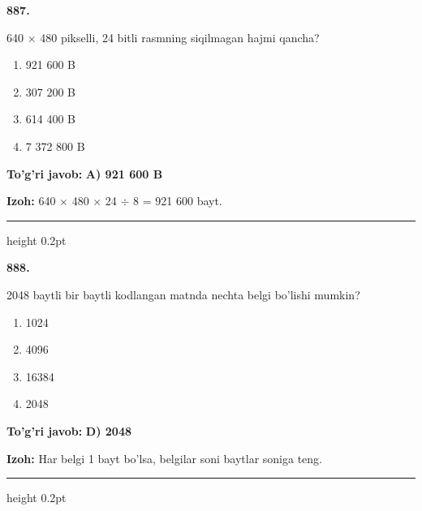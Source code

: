 \documentclass[10pt,a4paper,oneside]{article}
\begin{document}
\noindent\textbf{\color{ink}887.}
\par
640 \ensuremath{\times} 480 pikselli, 24 bitli rasmning siqilmagan hajmi qancha?
\begin{enumerate}[label=\Alph*),leftmargin=9mm]
\item 921 600 B
\item 307 200 B
\item 614 400 B
\item 7 372 800 B
\end{enumerate}
\begin{tcolorbox}[enhanced,breakable,colback=teal!4,colframe=teal!50!black,boxrule=0.5pt,arc=1.1mm,left=3mm,right=3mm,top=1.7mm,bottom=1.7mm,before skip=2mm,after skip=2mm]
\textbf{\color{teal}To'g'ri javob:} \textbf{A) 921 600 B}
\par\smallskip
\textbf{Izoh:} 640 \ensuremath{\times} 480 \ensuremath{\times} 24 \ensuremath{\div} 8 = 921 600 bayt.
\end{tcolorbox}
\vspace{2mm}\hrule height 0.2pt \vspace{3mm}

\noindent\textbf{\color{ink}888.}
\par
2048 baytli bir baytli kodlangan matnda nechta belgi bo'lishi mumkin?
\begin{enumerate}[label=\Alph*),leftmargin=9mm]
\item 1024
\item 4096
\item 16384
\item 2048
\end{enumerate}
\begin{tcolorbox}[enhanced,breakable,colback=teal!4,colframe=teal!50!black,boxrule=0.5pt,arc=1.1mm,left=3mm,right=3mm,top=1.7mm,bottom=1.7mm,before skip=2mm,after skip=2mm]
\textbf{\color{teal}To'g'ri javob:} \textbf{D) 2048}
\par\smallskip
\textbf{Izoh:} Har belgi 1 bayt bo'lsa, belgilar soni baytlar soniga teng.
\end{tcolorbox}
\vspace{2mm}\hrule height 0.2pt \vspace{3mm}
\end{document}
